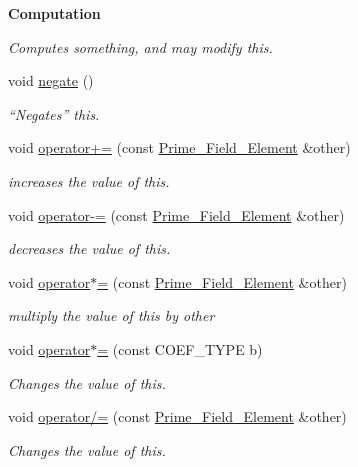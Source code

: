 \begin{Indent}\textbf{ Computation}\par
{\em Computes something, and may modify {\ttfamily this}. }\begin{DoxyCompactItemize}
\item 
\mbox{\label{group___fields_group_ab64fb1e850fb81bcf03345e11f5b6fb7}} 
void \hyperlink{group___fields_group_ab64fb1e850fb81bcf03345e11f5b6fb7}{negate} ()
\begin{DoxyCompactList}\small\item\em ``Negates'' {\ttfamily this}. \end{DoxyCompactList}\item 
void \hyperlink{group___fields_group_a28870a113aad5a9981512aca6c04d314}{operator+=} (const \hyperlink{group___fields_group_class_prime___field___element}{Prime\+\_\+\+Field\+\_\+\+Element} \&other)
\begin{DoxyCompactList}\small\item\em increases the value of {\ttfamily this}. \end{DoxyCompactList}\item 
void \hyperlink{group___fields_group_a19e1cde9dd774d554d8a1d5889a23344}{operator-\/=} (const \hyperlink{group___fields_group_class_prime___field___element}{Prime\+\_\+\+Field\+\_\+\+Element} \&other)
\begin{DoxyCompactList}\small\item\em decreases the value of {\ttfamily this}. \end{DoxyCompactList}\item 
void \hyperlink{group___fields_group_a1ef7c74bd84a82b7c346dd7fa4e4a480}{operator$\ast$=} (const \hyperlink{group___fields_group_class_prime___field___element}{Prime\+\_\+\+Field\+\_\+\+Element} \&other)
\begin{DoxyCompactList}\small\item\em multiply the value of {\ttfamily this} by {\ttfamily other} \end{DoxyCompactList}\item 
void \hyperlink{group___fields_group_af441fbbc222a4231bb4e3e23690d4a10}{operator$\ast$=} (const C\+O\+E\+F\+\_\+\+T\+Y\+PE b)
\begin{DoxyCompactList}\small\item\em Changes the value of {\ttfamily this}. \end{DoxyCompactList}\item 
void \hyperlink{group___fields_group_a73d679e6a6f2f55ac8f2873cfb11f91b}{operator/=} (const \hyperlink{group___fields_group_class_prime___field___element}{Prime\+\_\+\+Field\+\_\+\+Element} \&other)
\begin{DoxyCompactList}\small\item\em Changes the value of {\ttfamily this}. \end{DoxyCompactList}\end{DoxyCompactItemize}
\end{Indent}
